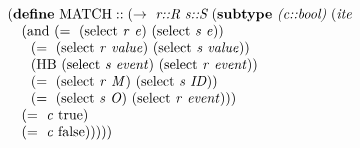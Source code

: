 \begin{equation}
\begin{array}{l}
(\cfgt{define}\ \mathrm{MATCH}::(\rightarrow\ \cfgnt{r::R}\ \cfgnt{s::S}\ (\cfgt{subtype}\ \cfgnt{(c::bool)}\ (\cfgnt{ite} \\
\ \ \ (\mathrm{and}\ (=\ (\mathrm{select}\ \mathit{r}\ \mathit{e})\ (\mathrm{select}\ \mathit{s}\ \mathit{e})) \\
\ \ \ \ \     (=\ (\mathrm{select}\ \mathit{r}\ \mathit{value})\ (\mathrm{select}\ \mathit{s}\ \mathit{value})) \\
\ \ \ \ \    (\mathrm{HB}\ (\mathrm{select}\ \mathit{s}\ \mathit{event})\ (\mathrm{select}\ \mathit{r}\ \mathit{event})) \\
\ \ \ \ \    (=\ (\mathrm{select}\ \mathit{r}\ \mathit{M})\ (\mathrm{select}\ \mathit{s}\ \mathit{ID})) \\
\ \ \ \ \    (=\ (\mathrm{select}\ \mathit{s}\ \mathit{O})\ (\mathrm{select}\ \mathit{r}\ \mathit{event}))) \\
\ \ \  (=\ \mathit{c}\ \mathrm{true}) \\
\ \ \  (=\ \mathit{c}\ \mathrm{false})))))
\end{array}
\label{equation:match}
\end{equation}



